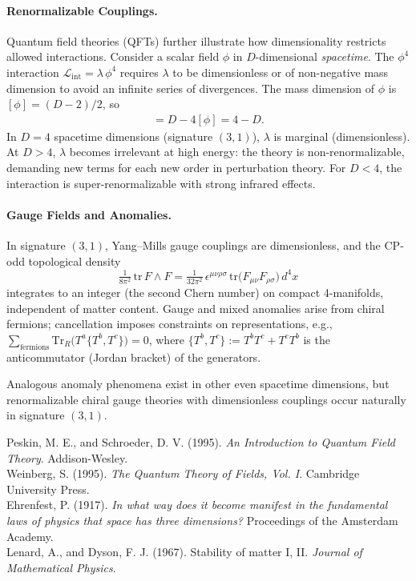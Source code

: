 \begin{technical}
    \paragraph{Renormalizable Couplings.}
    Quantum field theories (QFTs) further illustrate how dimensionality restricts allowed interactions. Consider a scalar field $\phi$ in $D$-dimensional \emph{spacetime}. The $\phi^4$ interaction $\mathcal{L}_{\mathrm{int}} = \lambda\,\phi^4$ requires $\lambda$ to be dimensionless or of non-negative mass dimension to avoid an infinite series of divergences. The mass dimension of $\phi$ is $[\phi] = (D - 2)/2$, so
    \begin{align*}  
    [\lambda] = D - 4[\phi] = 4 - D.
    \end{align*}
    In $D=4$ spacetime dimensions (signature $(3,1)$), $\lambda$ is marginal (dimensionless). At $D>4$, $\lambda$ becomes irrelevant at high energy: the theory is non-renormalizable, demanding new terms for each new order in perturbation theory. For $D<4$, the interaction is super-renormalizable with strong infrared effects.
    
    \paragraph{Gauge Fields and Anomalies.}
    In signature $(3,1)$, Yang–Mills gauge couplings are dimensionless, and the CP-odd topological density
    \[
    \tfrac{1}{8\pi^2}\,\mathrm{tr}\,F\wedge F = \tfrac{1}{32\pi^2}\,\epsilon^{\mu\nu\rho\sigma}\,\mathrm{tr}\!\big(F_{\mu\nu}F_{\rho\sigma}\big)\,d^4x
    \]
    integrates to an integer (the second Chern number) on compact 4-manifolds, independent of matter content. Gauge and mixed anomalies arise from chiral fermions; cancellation imposes constraints on representations, e.g.,\ $\sum_{\text{fermions}} \mathrm{Tr}_R\big(T^a\{T^b,T^c\}\big)=0$, where $\{T^b,T^c\} := T^b T^c + T^c T^b$ is the anticommutator (Jordan bracket) of the generators.
    
    Analogous anomaly phenomena exist in other even spacetime dimensions, but renormalizable chiral gauge theories with dimensionless couplings occur naturally in signature $(3,1)$.
    
\techref
    {\footnotesize
    Peskin, M. E., and Schroeder, D. V. (1995). \textit{An Introduction to Quantum Field Theory}. Addison-Wesley.\\
    Weinberg, S. (1995). \textit{The Quantum Theory of Fields, Vol. I}. Cambridge University Press.\\
    Ehrenfest, P. (1917). \textit{In what way does it become manifest in the fundamental laws of physics that space has three dimensions?} Proceedings of the Amsterdam Academy.\\
    Lenard, A., and Dyson, F. J. (1967). Stability of matter I, II. \textit{Journal of Mathematical Physics}.
    }
    
\end{technical}
    